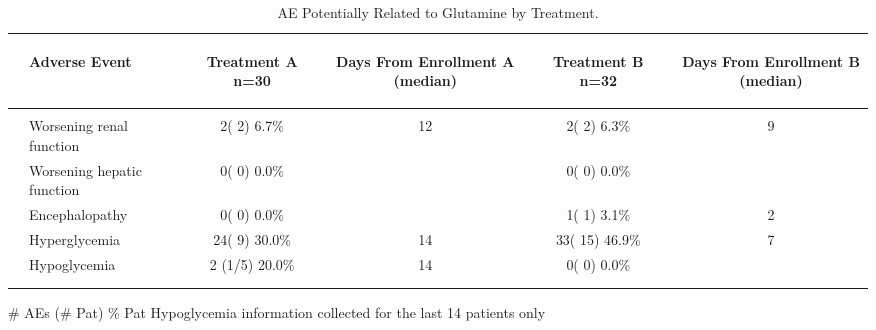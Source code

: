\documentclass[dvips,10pt]{article}
\begin{document}
\begin{table}[t]
\caption
{ AE Potentially Related to Glutamine by Treatment. }
\begin{center}
\begin{tabular}{ @{}l@{}
@{}l@{}@{}p{1.5em}@{}@{}c@{}@{}p{1.5em}@{}@{}c@{}@{}p{1.5em}@{}@{}c@{}@{}p{1.5em}@{}@{}c@{}
}
\hline

& \parbox{6em}{\begin{center}Adverse Event\end{center}} && \parbox{6em}{\begin{center}Treatment A n=30\end{center}} && \parbox{6em}{\begin{center}Days From Enrollment A (median)\end{center}} && \parbox{6em}{\begin{center}Treatment B n=32\end{center}} && \parbox{6em}{\begin{center}Days From Enrollment B (median)\end{center}} \\

\hline

\\
& Worsening renal function && 2(  2)  6.7\% && 12 && 2(  2)  6.3\% && 9 \\
& Worsening hepatic function && 0(  0)  0.0\% &&  && 0(  0)  0.0\% &&  \\
& Encephalopathy && 0(  0)  0.0\% &&  && 1(  1)  3.1\% && 2 \\
& Hyperglycemia && 24(  9) 30.0\% && 14 && 33( 15) 46.9\% && 7 \\
& Hypoglycemia && 2 (1/5) 20.0\% && 14 && 0(  0)  0.0\% &&  \\
\\
\hline \\

\end{tabular}


\parbox{ 5in }{ \# AEs (\# Pat) \% Pat \newline Hypoglycemia information collected for the last 14 patients only } \\
 \vspace{1em}\end{center}
 \end{table}
\clearpage
\end{document}
